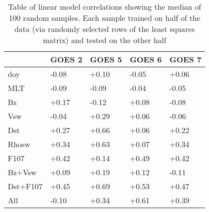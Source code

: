 \begin{table}[h]
\small
\begin{tabular}{|l|llll|}
\hline
 & GOES 2 & GOES 5 & GOES 6 & GOES 7\\ \hline
doy & -0.08 & +0.10 & -0.05 & +0.06 \\
MLT & -0.09 & -0.09 & -0.04 & -0.05 \\
Bz & +0.17 & -0.12 & +0.08 & -0.08 \\
Vsw & -0.04 & +0.29 & +0.06 & -0.06 \\
Dst & +0.27 & +0.66 & +0.06 & +0.22 \\
Rhosw & +0.34 & +0.63 & +0.07 & +0.34 \\
F107 & +0.42 & +0.14 & +0.49 & +0.42 \\
Bz+Vsw & +0.09 & +0.19 & +0.12 & -0.11 \\
Dst+F107 & +0.45 & +0.69 & +0.53 & +0.47 \\
All & -0.10 & +0.34 & +0.61 & +0.39 \\
\hline
\end{tabular}
\caption{Table of linear model correlations showing the median of 100 random samples. Each sample trained on half of the data (via randomly selected rows of the least squares matrix) and tested on the other half} 
\label{perltable}
\end{table}

